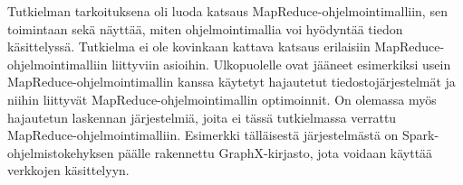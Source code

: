 \documentclass[finnish]{templates/tktltiki2}
\theoremstyle{definition}
\theoremstyle{remark}
\begin{document}
Tutkielman tarkoituksena oli luoda katsaus MapReduce-ohjelmointimalliin,
sen toimintaan sekä näyttää, miten ohjelmointimallia voi hyödyntää
tiedon käsittelyssä. Tutkielma ei ole kovinkaan kattava katsaus
erilaisiin MapReduce-ohjelmointimalliin liittyviin asioihin.
Ulkopuolelle ovat jääneet esimerkiksi usein MapReduce-ohjelmointimallin
kanssa käytetyt hajautetut tiedostojärjestelmät ja niihin liittyvät
MapReduce-ohjelmointimallin optimoinnit. On olemassa myös hajautetun
laskennan järjestelmiä, joita ei tässä tutkielmassa verrattu
MapReduce-ohjelmointimalliin. Esimerkki tälläisestä järjestelmästä on
Spark-ohjelmistokehyksen päälle rakennettu GraphX-kirjasto, jota voidaan
käyttää verkkojen käsittelyyn.

%
%
% 
%






% 
\end{document}
